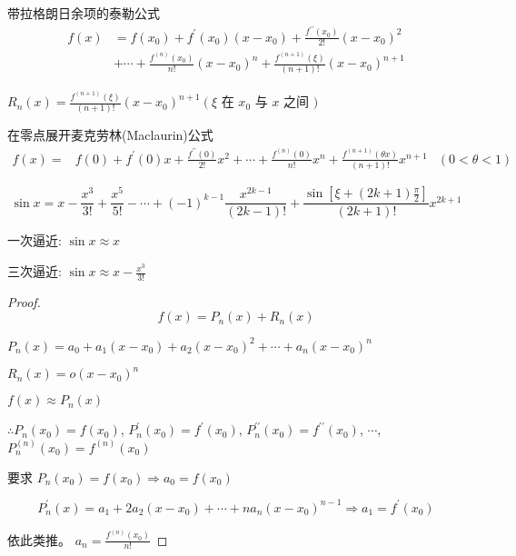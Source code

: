 \begin{corollary}[对于高阶余项的公式]
    带拉格朗日余项的泰勒公式
    $$ \begin{aligned} f(x) &=f\left(x_{0}\right)+f^{\prime}\left(x_{0}\right)\left(x-x_{0}\right)+\frac{f^{\prime \prime}\left(x_{0}\right)}{2 !}\left(x-x_{0}\right)^{2} \\ &+\cdots+\frac{f^{(n)}\left(x_{0}\right)}{n !}\left(x-x_{0}\right)^{n}+\frac{f^{(n+1)}(\xi)}{(n+1) !}\left(x-x_{0}\right)^{n+1} \end{aligned} $$

    $ R_{n}(x)=\frac{f^{(n+1)}(\xi)}{(n+1) !}\left(x-x_{0}\right)^{n+1}\left(\xi\right. $ 在 $ x_{0} $ 与 $ x  $ 之间 $ ) $
\end{corollary}

\begin{corollary}在零点展开麦克劳林(Maclaurin)公式
    $$ \begin{aligned} f(x)=& f(0)+f^{\prime}(0) x+\frac{f^{\prime \prime}(0)}{2 !} x^{2}+\cdots+\frac{f^{(n)}(0)}{n !} x^{n} +\frac{f^{(n+1)}(\theta x)}{(n+1) !} x^{n+1} &(0<\theta<1) \end{aligned} $$
    
\end{corollary}




\begin{example}
    $$ \sin x= x-\frac{x^{3}}{3 !}+\frac{x^{5}}{5 !}-\cdots+(-1)^{k-1} \frac{x^{2 k-1}}{(2 k-1) !}+\frac{\sin \left[\xi+(2 k+1) \frac{\pi}{2}\right]}{(2 k+1) !} x^{2 k+1} $$

    一次逼近: $  \sin x \approx x $

    三次逼近: $  \sin x \approx x-\frac{x^{3}}{3 !} $
\end{example}

\begin{proof}
    $$ f(x)=P_{n}(x)+R_{n}(x) $$
    
    $ P_{n}(x)=a_{0}+a_{1}\left(x-x_{0}\right)+a_{2}\left(x-x_{0}\right)^{2}+\cdots+a_{n}\left(x-x_{0}\right)^{n}  $

    $ R_{n}(x)=o\left(x-x_{0}\right)^{n} $

    $ f(x) \approx P_{n}(x) $

    $\therefore  P_{n}\left(x_{0}\right)=f\left(x_{0}\right) $,
    $ P_{n}^{\prime}\left(x_{0}\right)=f^{\prime}\left(x_{0}\right) $,
    $ P_{n}^{\prime \prime}\left(x_{0}\right)=f^{\prime \prime}\left(x_{0}\right) $,
    $ \cdots  $,
    $ P_{n}^{(n)}\left(x_{0}\right)=f^{(n)}\left(x_{0}\right) $

    要求 $ P_{n}\left(x_{0}\right)=f\left(x_{0}\right) \Rightarrow  a_{0}=f\left(x_{0}\right)  $

    $$ P_{n}^{\prime}(x)=a_{1}+2 a_{2}\left(x-x_{0}\right)+\cdots+n a_{n}\left(x-x_{0}\right)^{n-1} \Rightarrow  a_{1}=f^{\prime}\left(x_{0}\right)  $$

    依此类推。 $a_{n}=\frac{f^{(n)}\left(x_{0}\right)}{n !} $
\end{proof}